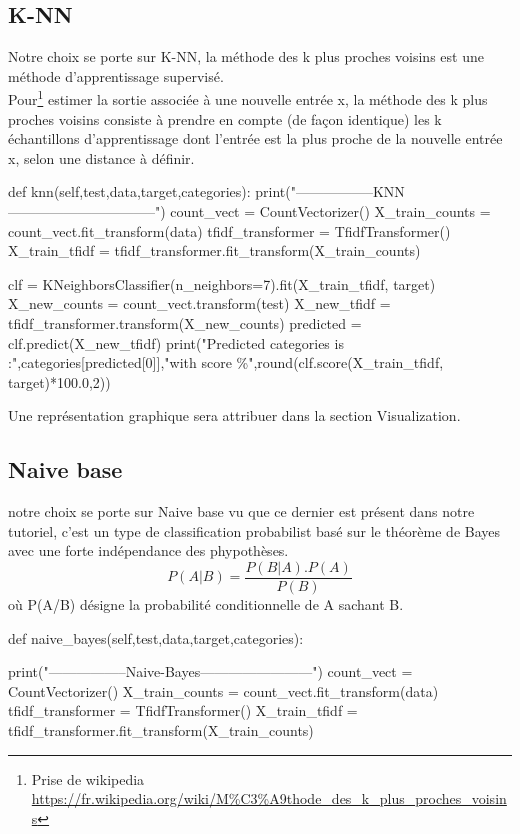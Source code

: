 \documentclass[english,a4paper,11pt,oneside]{article}
\begin{document}
{		\subsection{K-NN}{
			Notre choix se porte sur K-NN, la méthode des k plus proches voisins est une méthode d'apprentissage supervisé.\\
			Pour\footnote{Prise de wikipedia \url{https://fr.wikipedia.org/wiki/M\%C3\%A9thode_des_k_plus_proches_voisins}} estimer la sortie associée à une nouvelle entrée x, la méthode des k plus proches voisins consiste à prendre en compte (de façon identique) les k échantillons d'apprentissage dont l’entrée est la plus proche de la nouvelle entrée x, selon une distance à définir.\\
			\newpage
			\begin{pythonn}
def knn(self,test,data,target,categories):
	print("-----------------KNN--------------------------------")
	count_vect = CountVectorizer()
	X_train_counts = count_vect.fit_transform(data)
	tfidf_transformer = TfidfTransformer()
	X_train_tfidf = tfidf_transformer.fit_transform(X_train_counts)
	
	clf = KNeighborsClassifier(n_neighbors=7).fit(X_train_tfidf, target)
	X_new_counts = count_vect.transform(test)
	X_new_tfidf = tfidf_transformer.transform(X_new_counts)
	predicted = clf.predict(X_new_tfidf)
	print("Predicted categories is :",categories[predicted[0]],"with score  \%",round(clf.score(X_train_tfidf, target)*100.0,2))
				
			\end{pythonn}
			
			Une représentation graphique sera attribuer dans la section Visualization.
		}
		\subsection{Naive base}{
			notre choix se porte sur Naive base vu que ce dernier est présent dans notre tutoriel, c'est un type de classification probabilist basé sur le théorème de Bayes avec une forte indépendance des phypothèses.\\
			\begin{equation}
				P(A|B)=\frac{P(B|A) . P(A)}{P(B)}
			\end{equation}
			où P(A/B)  désigne la probabilité conditionnelle de A sachant B.
		\newpage
		\begin{pythonn}
def naive_bayes(self,test,data,target,categories):
			
	print("-----------------Naive-Bayes------------------------")
	count_vect = CountVectorizer()
	X_train_counts = count_vect.fit_transform(data)
	tfidf_transformer = TfidfTransformer()
	X_train_tfidf = tfidf_transformer.fit_transform(X_train_counts)
	

\end{pythonn}}}
\end{document}
